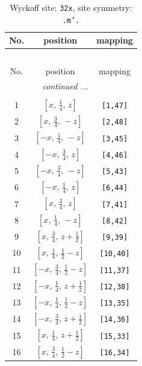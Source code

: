 \documentclass[fleqn,8pt]{jsarticle}
\begin{document}
\begin{longtable}{ccc}
\caption{Wyckoff site: {\tt 32x}, site symmetry: {\tt .m'.}}
 \\
 \hline \hline
No. & position & mapping \\ \hline \endfirsthead

\multicolumn{2}{l}{\tablename\ \thetable{}} \\
 \hline \hline
No. & position & mapping \\ \hline \endhead

 \hline \hline
\multicolumn{2}{r}{\footnotesize\it continued ...} \\ \endfoot

 \hline \hline
\multicolumn{2}{r}{} \\ \endlastfoot

1 & $\left[ x,\, \frac{1}{4},\, z \right]$ & {\tt [1,47]} \\ \hline
2 & $\left[ x,\, \frac{3}{4},\, - z \right]$ & {\tt [2,48]} \\ \hline
3 & $\left[ - x,\, \frac{1}{4},\, - z \right]$ & {\tt [3,45]} \\ \hline
4 & $\left[ - x,\, \frac{3}{4},\, z \right]$ & {\tt [4,46]} \\ \hline
5 & $\left[ - x,\, \frac{3}{4},\, - z \right]$ & {\tt [5,43]} \\ \hline
6 & $\left[ - x,\, \frac{1}{4},\, z \right]$ & {\tt [6,44]} \\ \hline
7 & $\left[ x,\, \frac{3}{4},\, z \right]$ & {\tt [7,41]} \\ \hline
8 & $\left[ x,\, \frac{1}{4},\, - z \right]$ & {\tt [8,42]} \\ \hline
9 & $\left[ x,\, \frac{3}{4},\, z + \frac{1}{2} \right]$ & {\tt [9,39]} \\ \hline
10 & $\left[ x,\, \frac{1}{4},\, \frac{1}{2} - z \right]$ & {\tt [10,40]} \\ \hline
11 & $\left[ - x,\, \frac{3}{4},\, \frac{1}{2} - z \right]$ & {\tt [11,37]} \\ \hline
12 & $\left[ - x,\, \frac{1}{4},\, z + \frac{1}{2} \right]$ & {\tt [12,38]} \\ \hline
13 & $\left[ - x,\, \frac{1}{4},\, \frac{1}{2} - z \right]$ & {\tt [13,35]} \\ \hline
14 & $\left[ - x,\, \frac{3}{4},\, z + \frac{1}{2} \right]$ & {\tt [14,36]} \\ \hline
15 & $\left[ x,\, \frac{1}{4},\, z + \frac{1}{2} \right]$ & {\tt [15,33]} \\ \hline
16 & $\left[ x,\, \frac{3}{4},\, \frac{1}{2} - z \right]$ & {\tt [16,34]} \\ \hline

\end{longtable}
\end{document}
